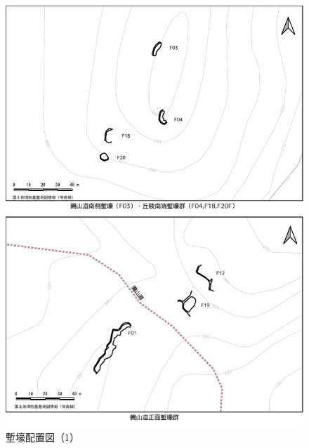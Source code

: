 \documentclass[11pt,report]{jsarticle}
\begin{document}
\begin{figure}[ht]
\centering
\includegraphics[width=160truemm]{../02fig/04zangou01.pdf}
\caption{塹壕配置図（1）}
\label{zangou01}
\end{figure}
\end{document}
